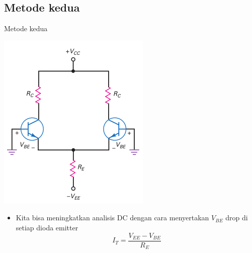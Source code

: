 \documentclass[aspectratio=169]{beamer}
\begin{document}
\subsection{Metode kedua}
\begin{frame}{Metode kedua}
	\begin{multicols}{2}
		\begin{center}
			\includegraphics[width=0.7\textheight]{gambar/01.second_approximation}
		\end{center}
		\columnbreak
		\begin{itemize}
			\item Kita bisa meningkatkan analisis DC dengan cara menyertakan $ V_{BE} $ drop di setiap dioda emitter
			\begin{equation} \label{pers.8}
				I_T = \frac{V_{EE} - V_{BE}}{R_E}
			\end{equation}
		\end{itemize}
		\vfill\null
	\end{multicols}
\end{frame}
\end{document}
